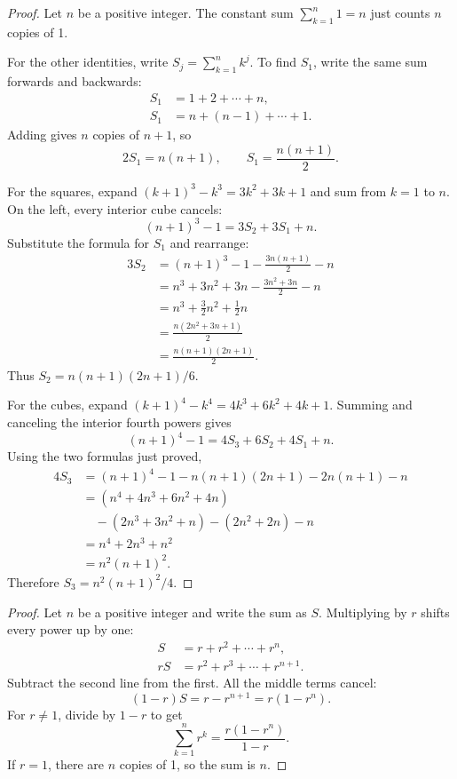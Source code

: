 \begin{proof}
Let $n$ be a positive integer. The constant sum $\sum_{k=1}^n1=n$
just counts $n$ copies of 1.

For the other identities, write $S_j=\sum_{k=1}^n k^j$.
To find $S_1$, write the same sum forwards and backwards:
\begin{align*}
S_1&=1+2+\cdots+n,\\
S_1&=n+(n-1)+\cdots+1.
\end{align*}
Adding gives $n$ copies of $n+1$, so
$$2S_1=n(n+1),\qquad S_1=\frac{n(n+1)}2.$$

For the squares, expand $(k+1)^3-k^3=3k^2+3k+1$ and sum from
$k=1$ to $n$. On the left, every interior cube cancels:
$$(n+1)^3-1=3S_2+3S_1+n.$$
Substitute the formula for $S_1$ and rearrange:
\begin{align*}
3S_2&=(n+1)^3-1-\frac{3n(n+1)}2-n\\
&=n^3+3n^2+3n-\frac{3n^2+3n}{2}-n\\
&=n^3+\frac32n^2+\frac12n\\
&=\frac{n(2n^2+3n+1)}2\\
&=\frac{n(n+1)(2n+1)}2.
\end{align*}
Thus $S_2=n(n+1)(2n+1)/6$.

For the cubes, expand $(k+1)^4-k^4=4k^3+6k^2+4k+1$.
Summing and canceling the interior fourth powers gives
$$(n+1)^4-1=4S_3+6S_2+4S_1+n.$$
Using the two formulas just proved,
\begin{align*}
4S_3&=(n+1)^4-1-n(n+1)(2n+1)-2n(n+1)-n\\
&=(n^4+4n^3+6n^2+4n)\\
&\quad-(2n^3+3n^2+n)-(2n^2+2n)-n\\
&=n^4+2n^3+n^2\\
&=n^2(n+1)^2.
\end{align*}
Therefore $S_3=n^2(n+1)^2/4$.
\end{proof}


\begin{proof}
Let $n$ be a positive integer and write the sum as $S$.
Multiplying by $r$ shifts every power up by one:
\begin{align*}
S&=r+r^2+\cdots+r^n,\\
rS&=r^2+r^3+\cdots+r^{n+1}.
\end{align*}
Subtract the second line from the first. All the middle terms cancel:
$$(1-r)S=r-r^{n+1}=r(1-r^n).$$
For $r\ne1$, divide by $1-r$ to get
$$\sum_{k=1}^n r^k=\frac{r(1-r^n)}{1-r}.$$
If $r=1$, there are $n$ copies of 1, so the sum is $n$.
\end{proof}

